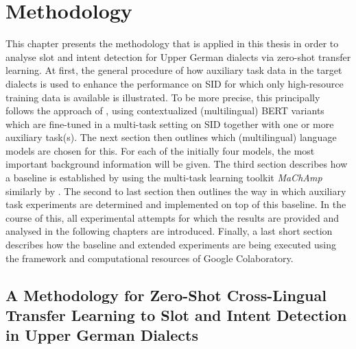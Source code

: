 \documentclass[11pt,a4paper,twoside,openright]{scrbook}
\begin{document}
\chapter{Methodology}

This chapter presents the methodology that is applied in this thesis in order to analyse slot and intent detection for Upper German dialects via zero-shot transfer learning. At first, the general procedure of how auxiliary task data in the target dialects is used to enhance the performance on SID for which only high-resource training data is available is illustrated. To be more precise, this principally follows the approach of \citet{van-der-goot-etal-2021-masked}, using contextualized (multilingual) BERT variants which are fine-tuned in a multi-task setting on SID together with one or more auxiliary task(s). The next section then outlines which (multilingual) language models are chosen for this. For each of the initially four models, the most important background information will be given. The third section describes how a baseline is established by using the multi-task learning toolkit \textit{MaChAmp} similarly by \citet{van-der-goot-etal-2021-massive}. The second to last section then outlines the way in which auxiliary task experiments are determined and implemented on top of this baseline. In the course of this, all experimental attempts for which the results are provided and analysed in the following chapters are introduced. Finally, a last short section describes how the baseline and extended experiments are being executed using the framework and computational resources of Google Colaboratory.







\section{A Methodology for Zero-Shot Cross-Lingual Transfer Learning to Slot and Intent Detection in Upper German Dialects}
\end{document}
